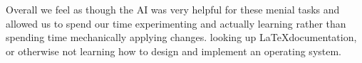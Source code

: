 \noindent Overall we feel as though the AI was very helpful for these menial tasks and allowed us to spend our time
experimenting and actually learning rather than spending time mechanically applying changes. looking up \LaTeX documentation,
or otherwise not learning how to design and implement an operating system.